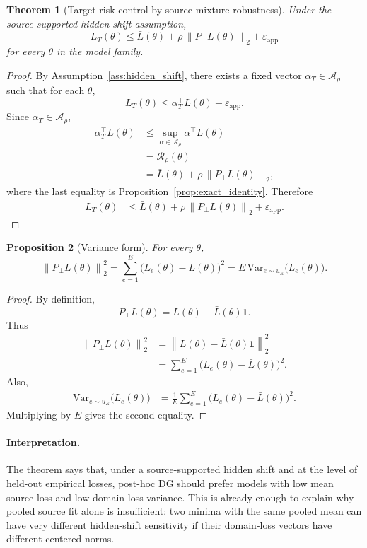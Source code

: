 \documentclass[11pt]{article}
\newcommand{\1}{\mathbf{1}}
\newcommand{\norm}[1]{\left\lVert #1 \right\rVert}
\newcommand{\ubar}{u_E}
\newcommand{\Aset}{\mathcal{A}_\rho}
\newcommand{\Pperp}{P_\perp}
\theoremstyle{plain}
\newtheorem{theorem}{Theorem}[section]
\newtheorem{proposition}[theorem]{Proposition}
\theoremstyle{definition}
\theoremstyle{remark}
\begin{document}
\begin{theorem}[Target-risk control by source-mixture robustness]\label{thm:target_bound_basic}
Under the source-supported hidden-shift assumption,
\[
L_T(\theta) \le \bar L(\theta) + \rho\,\norm{\Pperp L(\theta)}_2 + \varepsilon_{\mathrm{app}}
\]
for every $\theta$ in the model family.
\end{theorem}

\begin{proof}
By Assumption~\ref{ass:hidden_shift}, there exists a fixed vector $\alpha_T \in \Aset$ such that for each $\theta$,
\[
L_T(\theta) \le \alpha_T^\top L(\theta) + \varepsilon_{\mathrm{app}}.
\]
Since $\alpha_T \in \Aset$,
\begin{align*}
\alpha_T^\top L(\theta)
&\le \sup_{\alpha \in \Aset} \alpha^\top L(\theta) \\
&= \mathcal{R}_{\rho}(\theta) \\
&= \bar L(\theta) + \rho\,\norm{\Pperp L(\theta)}_2,
\end{align*}
where the last equality is Proposition~\ref{prop:exact_identity}. Therefore
\begin{align*}
L_T(\theta)
&\le \bar L(\theta) + \rho\,\norm{\Pperp L(\theta)}_2 + \varepsilon_{\mathrm{app}}.
\end{align*}
\end{proof}

\begin{proposition}[Variance form]\label{prop:variance}
For every $\theta$,
\[
\norm{\Pperp L(\theta)}_2^2
= \sum_{e=1}^E \bigl(L_e(\theta) - \bar L(\theta)\bigr)^2
= E\,\mathrm{Var}_{e \sim \ubar}\bigl(L_e(\theta)\bigr).
\]
\end{proposition}

\begin{proof}
By definition,
\[
\Pperp L(\theta) = L(\theta) - \bar L(\theta)\1.
\]
Thus
\begin{align*}
\norm{\Pperp L(\theta)}_2^2
&= \norm{L(\theta) - \bar L(\theta)\1}_2^2 \\
&= \sum_{e=1}^E \bigl(L_e(\theta) - \bar L(\theta)\bigr)^2.
\end{align*}
Also,
\begin{align*}
\mathrm{Var}_{e \sim \ubar}\bigl(L_e(\theta)\bigr)
&= \frac{1}{E}\sum_{e=1}^E \bigl(L_e(\theta) - \bar L(\theta)\bigr)^2.
\end{align*}
Multiplying by $E$ gives the second equality.
\end{proof}

\paragraph{Interpretation.}
The theorem says that, under a source-supported hidden shift and at the level of held-out empirical losses, post-hoc DG should prefer models with low mean source loss and low domain-loss variance. This is already enough to explain why pooled source fit alone is insufficient: two minima with the same pooled mean can have very different hidden-shift sensitivity if their domain-loss vectors have different centered norms.
\end{document}
